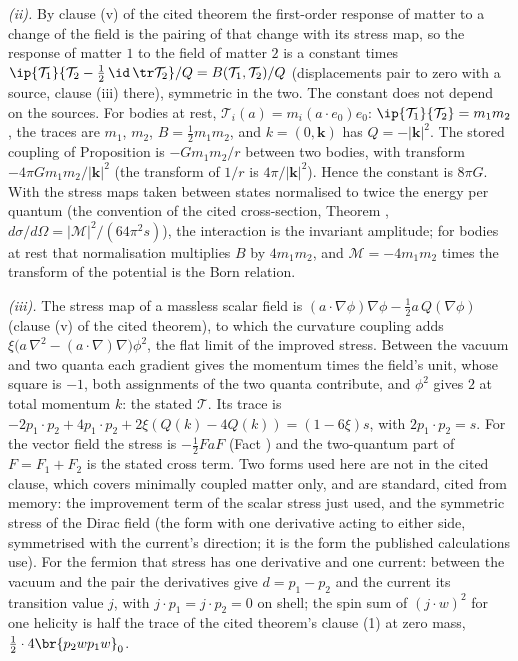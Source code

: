 \emph{(ii).} By clause (v) of the cited theorem the first-order response of matter to a change of the field is the pairing of that change with its stress map, so the response of matter $1$ to the field of matter $2$ is a constant times $\ip{\mathcal{T}_{1}}{\mathcal{T}_{2} - \tfrac12\,\id\,\tr\mathcal{T}_{2}}/Q = B(\mathcal{T}_{1},\mathcal{T}_{2})/Q$ (displacements pair to zero with a source, clause (iii) there), symmetric in the two. The constant does not depend on the sources. For bodies at rest, $\mathcal{T}_{i}(a) = m_{i}(a \cdot e_{0})e_{0}$: $\ip{\mathcal{T}_{1}}{\mathcal{T}_{2}} = m_{1}m_{2}$, the traces are $m_{1}$, $m_{2}$, $B = \tfrac12 m_{1}m_{2}$, and $k = (0, \mathbf{k})$ has $Q = -|\mathbf{k}|^{2}$. The stored coupling of Proposition  is $-Gm_{1}m_{2}/r$ between two bodies, with transform $-4\pi Gm_{1}m_{2}/|\mathbf{k}|^{2}$ (the transform of $1/r$ is $4\pi/|\mathbf{k}|^{2}$). Hence the constant is $8\pi G$. With the stress maps taken between states normalised to twice the energy per quantum (the convention of the cited cross-section, Theorem , $d\sigma/d\Omega = |\mathcal{M}|^{2}/(64\pi^{2}s)$), the interaction is the invariant amplitude; for bodies at rest that normalisation multiplies $B$ by $4m_{1}m_{2}$, and $\mathcal{M} = -4m_{1}m_{2}$ times the transform of the potential is the Born relation.

\emph{(iii).} The stress map of a massless scalar field is $(a \cdot \nabla\phi)\nabla\phi - \tfrac12 a\,Q(\nabla\phi)$ (clause (v) of the cited theorem), to which the curvature coupling adds $\xi\bigl(a\,\nabla^{2} - (a \cdot \nabla)\nabla\bigr)\phi^{2}$, the flat limit of the improved stress. Between the vacuum and two quanta each gradient gives the momentum times the field's unit, whose square is $-1$, both assignments of the two quanta contribute, and $\phi^{2}$ gives $2$ at total momentum $k$: the stated $\mathcal{T}$. Its trace is $-2p_{1} \cdot p_{2} + 4p_{1} \cdot p_{2} + 2\xi(Q(k) - 4Q(k)) = (1 - 6\xi)s$, with $2p_{1} \cdot p_{2} = s$. For the vector field the stress is $-\tfrac12 FaF$ (Fact ) and the two-quantum part of $F = F_{1} + F_{2}$ is the stated cross term. Two forms used here are not in the cited clause, which covers minimally coupled matter only, and are standard, cited from memory: the improvement term of the scalar stress just used, and the symmetric stress of the Dirac field (the form with one derivative acting to either side, symmetrised with the current's direction; it is the form the published calculations use). For the fermion that stress has one derivative and one current: between the vacuum and the pair the derivatives give $d = p_{1} - p_{2}$ and the current its transition value $j$, with $j \cdot p_{1} = j \cdot p_{2} = 0$ on shell; the spin sum of $(j \cdot w)^{2}$ for one helicity is half the trace of the cited theorem's clause (1) at zero mass, $\tfrac12 \cdot 4\br{p_{2}wp_{1}w}_{0}$.

